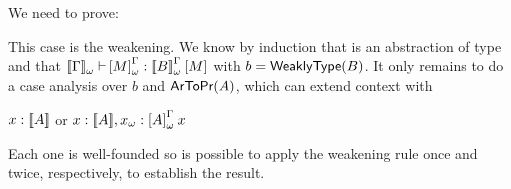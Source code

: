 \begin{Proof}
\begin{WarningProofCase}{\CicWeak}
\noindent We need to prove:
\begin{center}
\end{center}

This case is the weakening. We know by induction that  is an abstraction of type
 and that
$\ctyping[\WContextTrans{\Context}][]{\WParamTrans{M}}{\app{\WParamTypeTrans{B}}}{\Trans{M}}$ 
with $b=\weaklypropFun[B]$. It only remains to do a case analysis over $b$ and $\propFun[A]$,
which can extend context with
\begin{center}
$x:[\![A]\!]$ 
\hspace{2em}
or
\hspace{2em}
\mbox{$\typing{x}{\TypeTrans{A}},\typing{\WTermTrans{x}}{\app{\WParamTrans{A}}{x}}$}    
\end{center}
Each one is well-founded so is possible to apply the weakening rule once and twice, respectively,
to establish the result.
\end{WarningProofCase}


\end{Proof}
